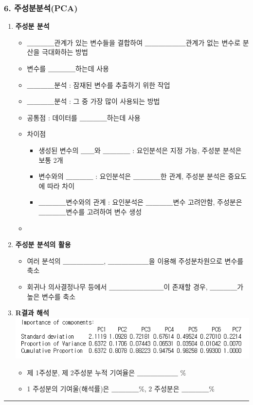 \documentclass[11pt]{article}
\makeatletter
\def\maxwidth{\ifdim\Gin@nat@width>\linewidth\linewidth
    \else\Gin@nat@width\fi}
\let\Oldincludegraphics\includegraphics
\renewcommand{\includegraphics}[1]{\Oldincludegraphics[width=.8\maxwidth]{#1}}
\providecommand{\tightlist}{%
      \setlength{\itemsep}{0pt}\setlength{\parskip}{0pt}}
\makeatother
\begin{document}
    \hypertarget{uxc8fcuxc131uxbd84uxbd84uxc11dpca}{%
\subsubsection{6.
주성분분석(PCA)}\label{uxc8fcuxc131uxbd84uxbd84uxc11dpca}}

\begin{enumerate}
\def\labelenumi{\arabic{enumi}.}
\tightlist
\item
  \textbf{주성분 분석}

  \begin{itemize}
  \item
    ＿＿＿＿관계가 있는 변수들을 결합하여 ＿＿＿＿＿＿관계가 없는 변수로
    분산을 극대화하는 방법
  \item
    변수를 ＿＿＿＿하는데 사용
  \item
    ＿＿＿＿분석 : 잠재된 변수를 추출하기 위한 작업
  \item
    ＿＿＿＿분석 : 그 중 가장 많이 사용되는 방법
  \item
    공통점 : 데이터를 ＿＿＿＿하는데 사용
  \item
    차이점

    \begin{itemize}
    \tightlist
    \item
      생성된 변수의 ＿＿와 ＿＿＿＿ : 요인분석은 지정 가능, 주성분
      분석은 보통 2개
    \item
      변수와의 ＿＿＿＿ : 요인분석은 ＿＿＿＿한 관계, 주성분 분석은
      중요도에 따라 차이
    \item
      ＿＿＿＿변수와의 관계 : 요인분석은 ＿＿＿＿변수 고려안함, 주성분은
      ＿＿＿＿변수를 고려하여 변수 생성
    \end{itemize}
  \item
  \end{itemize}
\item
  \textbf{주성분 분석의 활용}

  \begin{itemize}
  \tightlist
  \item
    여러 분석의 ＿＿＿＿＿＿, ＿＿＿＿＿＿을 이용해 주성분차원으로
    변수를 축소
  \item
    회귀나 의사결정나무 등에서 ＿＿＿＿＿＿＿＿이 존재할 경우,
    ＿＿＿＿가 높은 변수를 축소 
  \end{itemize}
\item
  \textbf{R결과 해석} \includegraphics{img/pca.png}

  \begin{itemize}
  \tightlist
  \item
    제 1주성분, 제 2주성분 누적 기여율은 ＿＿＿＿＿＿ \%
  \item
    1 주성분의 기여울(해석률)은 ＿＿＿＿\%, 2 주성분은 ＿＿＿＿\%
  \end{itemize}
\end{enumerate}

    \begin{center}\rule{0.5\linewidth}{\linethickness}\end{center}


    
    
    
    
\end{document}
